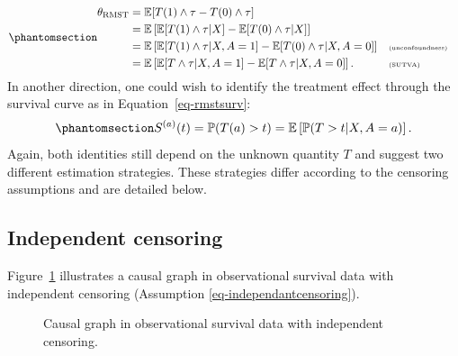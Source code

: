 \documentclass[
  11pt,
  a4paper,
]{article}
\theoremstyle{plain}
\theoremstyle{plain}
\theoremstyle{plain}
\theoremstyle{definition}
\theoremstyle{remark}
\begin{document}
\begin{equation}\phantomsection\label{eq-identcond}{
\begin{aligned}
    \theta_{\mathrm{RMST}} &=  \mathbb{E}[T(1) \wedge \tau - T(0) \wedge \tau]\\
    &= \mathbb{E}\left[\mathbb{E}[T(1) \wedge \tau|X] - \mathbb{E}[T(0) \wedge \tau|X] \right]  &&  \\
    &=\mathbb{E}\left[\mathbb{E}[T(1) \wedge \tau|X, A=1] - \mathbb{E}[T(0) \wedge \tau|X, A=0]\right]   && \tiny\text{(unconfoundness)} \\
       &= \mathbb{E}\left[\mathbb{E}[T \wedge \tau|X, A=1] - \mathbb{E}[T \wedge \tau|X, A=0]\right].  && \tiny\text{(SUTVA)}
\end{aligned}
}\end{equation} In another direction, one could wish to identify the
treatment effect through the survival curve as in
Equation~\ref{eq-rmstsurv}:
\begin{equation}\phantomsection\label{eq-kmcond}{
S^{(a)}(t) = \mathbb{P}(T(a) > t) = \mathbb{E}\left[\mathbb{P}(T > t | X, A=a)\right].
}\end{equation} Again, both identities still depend on the unknown
quantity \(T\) and suggest two different estimation strategies. These
strategies differ according to the censoring assumptions and are
detailed below.

\subsection{Independent censoring}\label{sec-obs_indcen}

Figure~\ref{fig-causalgraph_obs_ind} illustrates a causal graph in
observational survival data with independent censoring (Assumption
\ref{eq-independantcensoring}).

\begin{figure}


\caption{\label{fig-causalgraph_obs_ind}Causal graph in observational
survival data with independent censoring.}

\end{figure}%
\end{document}
